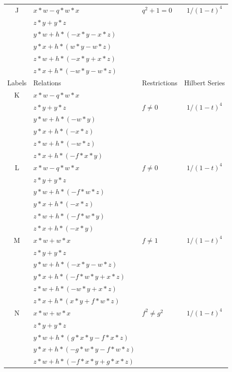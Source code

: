 \documentclass[12]{article}
\begin{document}
\begin{longtable}[c]{|c|p{5.75cm}|p{2.75cm}|c|}
\hline
 J & $ x*w - q*w*x $ &\multirow{6}{*}{$ q^2 + 1 = 0 $} &\multirow{6}{*}{$ 1/(1-t)^4 $} \\ 
    & $ z*y + y*z $ & &  \\ 
   & $  y*w + h*(-x*y - x*z ) $ & & \\  
   & $ y*x + h*(w*y - w*z ) $ & & \\  
   & $ z*w + h*(-x*y + x*z ) $ & & \\ 
   & $  z*x + h*(-w*y - w*z ) $ & &  \\  
\hline
\pagebreak
\midrule[1.0pt]
Labels & Relations & Restrictions & Hilbert Series \\
\hline
 K & $ x*w - q*w*x $ & & \\ 
    & $ z*y + y*z $ &$ f \neq 0 $ & $ 1/(1-t)^4 $ \\ 
   & $ y*w + h*(-w*y) $ & & \\  
   & $ y*x + h*(-x*z) $ & & \\  
   & $ z*w + h*(-w*z) $ & & \\ 
   & $  z*x + h*(-f*x*y) $ & &  \\  
\hline
 L & $ x*w - q*w*x $ &\multirow{6}{*}{$ f \neq 0 $} &\multirow{6}{*}{$ 1/(1-t)^4 $} \\ 
    & $ z*y + y*z $ & &  \\
   & $ y*w + h*(-f*w*z) $ & & \\  
   & $ y*x + h*(-x*z) $ & & \\  
   & $ z*w + h*(-f*w*y) $ & & \\ 
   & $ z*x + h*(-x*y) $ & &  \\  
\hline
 M & $ x*w + w*x $ &\multirow{6}{*}{$ f \neq 1 $} &\multirow{6}{*}{$ 1/(1-t)^4 $} \\ 
    & $ z*y + y*z $ & &  \\ 
   & $ y*w + h*(-x*y - w*z ) $ & & \\  
   & $ y*x + h*(-f*w*y + x*z ) $ & & \\  
   & $ z*w + h*(-w*y + x*z ) $ & & \\ 
   & $ z*x + h*(x*y + f*w*z ) $ & &  \\  
\hline
 N & $ x*w + w*x $ &\multirow{6}{*}{ $ f^2 \neq g^2 $} &\multirow{6}{*}{$ 1/(1-t)^4 $} \\ 
    & $  z*y + y*z  $ & &  \\ 
   & $ y*w + h*(g*x*y - f*x*z ) $ & & \\  
   & $ y*x + h*(-g*w*y - f*w*z )  $ & & \\  
   & $ z*w + h*(-f*x*y + g*x*z ) $ & & \\ 

\end{longtable}
\end{document}
